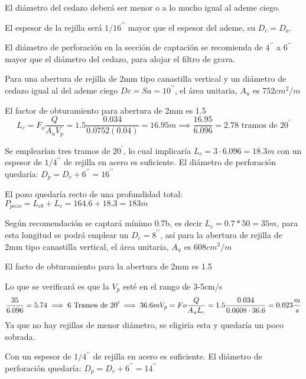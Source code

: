 El diámetro del cedazo deberá ser menor o a lo mucho igual al ademe ciego.

El espesor de la rejilla será $1/16^{\prime\prime}$ mayor que el espesor del ademe, su $D_c=D_a$.

El diámetro de perforación en la sección de captación se recomienda de $4^{\prime\prime}$ a $6^{\prime\prime}$ mayor que el diámetro del cedazo, para alojar el filtro de grava.

\begin{problem}
    Para una abertura de rejilla de 2mm tipo canastilla vertical y un diámetro de cedazo igual al del ademe ciego $Dc=Sa=10^{\prime\prime}$, el área unitaria, $A_u$ es $752 cm^2/m$

    El factor de obturamiento para abertura de 2mm es 1.5
    \begin{equation*}
        L_c = F_o \frac{Q}{A_uV_p}= 1.5 \frac{0.034}{0.0752(0.04)} = 16.95m\implies \frac{16.95}{6.096} = 2.78\text{ tramos de } 20^{\prime}
    \end{equation*}

    Se emplearían tres tramos de $20^{\prime}$, lo cual implicaría $L_c= 3\cdot 6.096= 18.3m$ con un espesor de $1/4^{\prime\prime}$ de rejilla en acero es suficiente. El diámetro de perforación quedaría: $D_p= D_c+6^{\prime\prime}= 16^{\prime\prime}$

    El pozo quedaría recto de una profundidad total: $P_{pozo}=L_{cb}+L_c= 164.6+18.3=183m$
\end{problem}

\begin{problem}[Acuífero confinado de $b=50m$]
    Según recomendación se captará mínimo 0.7b, es decir $L_c=0.7*50=35m$, para esta longitud se podrá emplear un $D_c=8^{\prime\prime}$, así para la abertura de rejilla de 2mm tipo canastilla vertical, el área unitaria, $A_u$ es $608cm^2/m$

El facto de obturamiento para la abertura de 2mm es 1.5

Lo que se verificará es que la $V_p$ esté en el rango de 3-5cm/s
\begin{equation*}
    \frac{35}{6.096} = 5.74\implies 6 \text{ Tramos de } 20^{\prime} \implies 36.6m\\
    V_p = Fo \frac{Q}{A_u L_c} = 1.5 \frac{0.034}{0.0608 \cdot 36.6 } = 0.023 \frac{m}{s}
\end{equation*}
Ya que no hay rejillas de menor diámetro, se eligiría esta y quedaría un poco sobrada.

Con un espesor de $1/4^{\prime\prime}$ de rejilla en acero es suficiente. El diámetro de perforación quedaría: $D_p= D_c+6^{\prime\prime} = 14^{\prime\prime}$
\end{problem}


